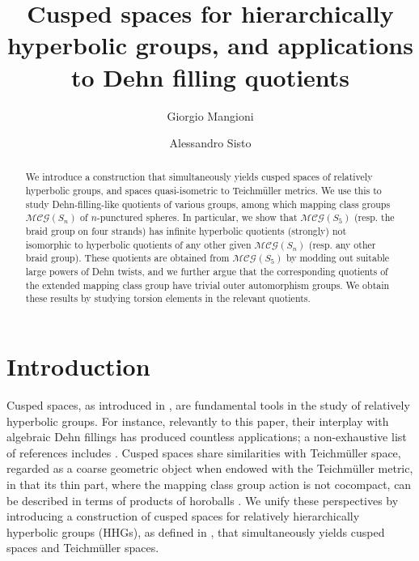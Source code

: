\documentclass[svgnames]{amsart}
\title[Cusped spaces for HHG]{Cusped spaces for hierarchically hyperbolic groups, and applications to Dehn filling quotients}
\author[G. Mangioni]{Giorgio Mangioni}
\author[A. Sisto]{Alessandro Sisto}
\theoremstyle{plain}
\theoremstyle{definition}
\newcommand{\MCG}{\mathcal{MCG}}
\begin{document}
\begin{abstract}
    We introduce a construction that simultaneously yields cusped spaces of relatively hyperbolic groups, and spaces quasi-isometric to Teichm\"{u}ller metrics. We use this to study Dehn-filling-like quotients of various groups, among which mapping class groups $\MCG(S_n)$ of $n$-punctured spheres. In particular, we show that $\MCG(S_5)$ (resp. the braid group on four strands) has infinite hyperbolic quotients (strongly) not isomorphic to hyperbolic quotients of any other given $\MCG(S_n)$ (resp. any other braid group). These quotients are obtained from $\MCG(S_5)$ by modding out suitable large powers of Dehn twists, and we further argue that the corresponding quotients of the extended mapping class group have trivial outer automorphism groups. We obtain these results by studying torsion elements in the relevant quotients.
\end{abstract}

\maketitle


\section*{Introduction}
 Cusped spaces, as introduced in \cite{GrovesManning, Bow-relhyp}, are fundamental tools in the study of relatively hyperbolic groups. For instance, relevantly to this paper, their interplay with algebraic Dehn fillings has produced countless applications; a non-exhaustive list of references includes \cite{GrovesManning,AGM_dehnfill,virtual_Haken,  dahmaniguirardel, GM-elementary, isomorphy, GMS,  quasiconvexity_and_Dehn_filling, Wang}. Cusped spaces share similarities with Teichm\"{u}ller space, regarded as a coarse geometric object when endowed with the Teichm\"{u}ller metric, in that its thin part, where the mapping class group action is not cocompact, can be described in terms of products of horoballs \cite{Minsky_productregion,Durham_augmented_markings}. We unify these perspectives by introducing a construction of cusped spaces for relatively hierarchically hyperbolic groups (HHGs), as defined in \cite{HHS_I, HHS_II}, that simultaneously yields cusped spaces and Teichm\"{u}ller spaces. 
 
\end{document}

